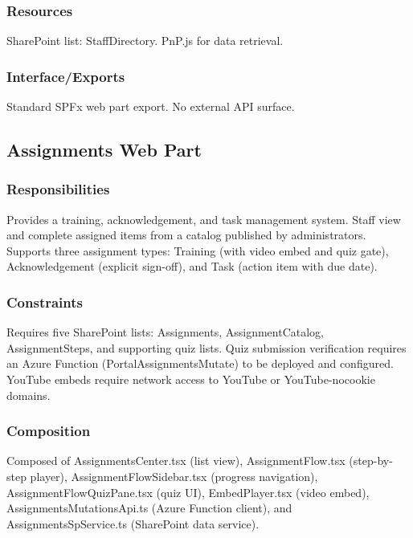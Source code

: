\documentclass[12pt]{article}
\begin{document}
\subsubsection{Resources}

SharePoint list: StaffDirectory. PnP.js for data retrieval.

\subsubsection{Interface/Exports}

Standard SPFx web part export. No external API surface.

\subsection{Assignments Web Part}

\subsubsection{Responsibilities}

Provides a training, acknowledgement, and task management system. Staff view and complete assigned items from a catalog published by administrators. Supports three assignment types: Training (with video embed and quiz gate), Acknowledgement (explicit sign-off), and Task (action item with due date).

\subsubsection{Constraints}

Requires five SharePoint lists: Assignments, AssignmentCatalog, AssignmentSteps, and supporting quiz lists. Quiz submission verification requires an Azure Function (PortalAssignmentsMutate) to be deployed and configured. YouTube embeds require network access to YouTube or YouTube-nocookie domains.

\subsubsection{Composition}

Composed of AssignmentsCenter.tsx (list view), AssignmentFlow.tsx (step-by-step player), AssignmentFlowSidebar.tsx (progress navigation), AssignmentFlowQuizPane.tsx (quiz UI), EmbedPlayer.tsx (video embed), AssignmentsMutationsApi.ts (Azure Function client), and AssignmentsSpService.ts (SharePoint data service).
\end{document}
